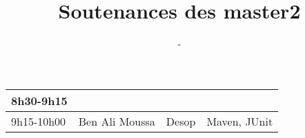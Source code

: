 \documentclass{article}
\title{\huge Soutenances des master2}
\author{\Huge \lemaster}
\date{\huge \ladate - \lasalle}
\begin{document}
\maketitle
\pagestyle{empty}
\Large

\hspace*{-3cm}\begin{tabular}[t]{|l|l|l|l|}\hline
8h30-9h15 & & &\\ \hline
9h15-10h00 &  Ben Ali Moussa& Desop & Maven, JUnit\\ \hline
\end{tabular}
\end{document}
